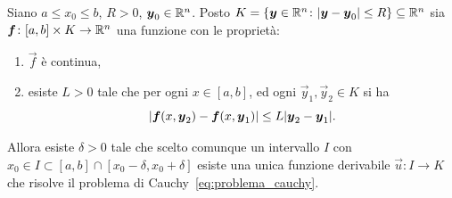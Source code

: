 \begin{theorem}%
  \label{th:cauchy_lipschitz}%
Siano $a\le x_0 \le b$, $R>0$, $\boldsymbol y_0 \in {\mathbb R}^n$. 
Posto $K={\left\{ \boldsymbol y\in {\mathbb R}^n \colon {\left|\boldsymbol y - \boldsymbol y_0\right|}\le R \right\}}\subseteq {\mathbb R}^n$ 
sia $\boldsymbol f\colon [a,b]\times K\to {\mathbb R}^n$ una funzione con le proprietà:
\begin{enumerate}
  \item $\vec f$ è continua,
  \item esiste $L>0$ tale che per ogni $x\in [a,b]$, ed ogni $\vec y_1,\vec y_2 \in K$ 
  si ha 
  \begin{equation}\label{eq:hp_lipschitz}
  {\left|\boldsymbol f(x, \boldsymbol y_2) - \boldsymbol f(x,\boldsymbol y_1)\right|} \le L {\left|\boldsymbol y_2- \boldsymbol y_1\right|}.  
  \end{equation}
\end{enumerate}

Allora esiste $\delta>0$ tale che scelto comunque un intervallo $I$ con 
$x_0\in I \subset [a,b]\cap [x_0-\delta, x_0+\delta]$ 
esiste una unica funzione derivabile $\vec u\colon I \to K$ 
che risolve il problema di Cauchy~\eqref{eq:problema_cauchy}.
\end{theorem}
%
